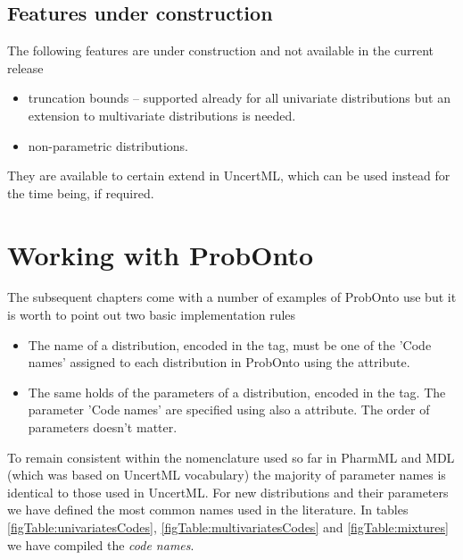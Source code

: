\subsection{Features under construction}
The following features are under construction and not available in the current 
release
\begin{itemize}
\item
truncation bounds -- supported already for all univariate distributions but an extension 
to multivariate distributions is needed.
\item
non-parametric distributions.
\end{itemize}
They are available to certain extend in UncertML, which can be used instead for the time being, if required.

\section{Working with ProbOnto}
\label{sec:workingProbOnto}
The subsequent chapters come with a number of examples of ProbOnto use
but it is worth to point out two basic implementation rules 
\begin{itemize}
\item 
The name of a distribution, encoded in the  tag, 
must be one of the 'Code names' assigned to each distribution in ProbOnto
using the  attribute. 
\item
The same holds of the parameters of a distribution, encoded in the  tag.
The parameter 'Code names' are specified using also a  attribute. 
The order of parameters doesn't matter. 
\end{itemize}
To remain consistent within the nomenclature used so far in PharmML and MDL (which
was based on UncertML vocabulary) the majority of parameter names is identical 
to those used in UncertML. For new distributions and their parameters we have 
defined the most common names used in the literature. 
In tables \ref{figTable:univariatesCodes}, \ref{figTable:multivariatesCodes} 
and \ref{figTable:mixtures} we have compiled the \emph{code names}. 

